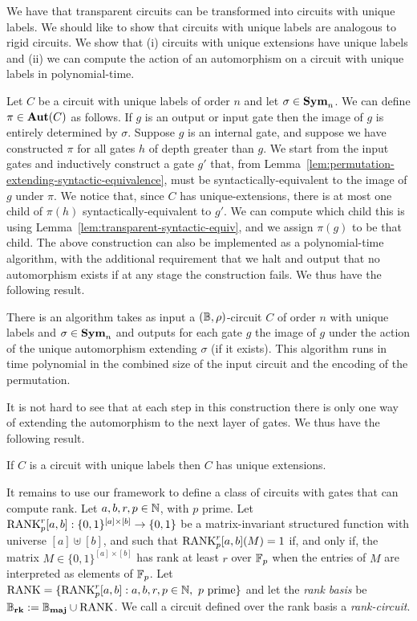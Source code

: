 \documentclass[a4paper,UKenglish]{lipics-v2018}
\begin{document}
We have that transparent circuits can be transformed into circuits with unique
labels. We should like to show that circuits with unique labels are analogous to
rigid circuits. We show that (i) circuits with unique extensions have unique
labels and (ii) we can compute the action of an automorphism on a circuit with
unique labels in polynomial-time.

Let $C$ be a circuit with unique labels of order $n$ and let $\sigma \in
\text{\textbf{Sym}}_n$. We can define $\pi \in \text{\textbf{Aut}}(C)$ as follows. If $g$ is an output or
input gate then the image of $g$ is entirely determined by $\sigma$. Suppose $g$
is an internal gate, and suppose we have constructed $\pi$ for all gates $h$ of
depth greater than $g$. We start from the input gates and inductively construct
a gate $g'$ that, from
Lemma~\ref{lem:permutation-extending-syntactic-equivalence}, must be
syntactically-equivalent to the image of $g$ under $\pi$. We notice that, since
$C$ has unique-extensions, there is at most one child of $ \pi(h)$
syntactically-equivalent to $g'$. We can compute which child this is using
Lemma~\ref{lem:transparent-syntactic-equiv}, and we assign $\pi(g)$ to be that
child. The above construction can also be implemented as a polynomial-time
algorithm, with the additional requirement that we halt and output that no
automorphism exists if at any stage the construction fails. We thus have the
following result.

\begin{lemma}
  There is an algorithm takes as input a $(\mathbb{B}, \rho)$-circuit $C$ of order $n$
  with unique labels and $\sigma \in \text{\textbf{Sym}}_n$ and outputs for each gate $g$ the
  image of $g$ under the action of the unique automorphism extending $\sigma$
  (if it exists). This algorithm runs in time polynomial in the combined size of
  the input circuit and the encoding of the permutation.
  \label{lem:compute-automorphisms}
\end{lemma}

It is not hard to see that at each step in this construction there is only one
way of extending the automorphism to the next layer of gates. We thus have the
following result.

\begin{lemma}
  If $C$ is a circuit with unique labels then $C$ has unique extensions.
  \label{lem:unique-labels-unique-extensions}
\end{lemma}

It remains to use our framework to define a class of circuits with gates that
can compute rank. Let $a, b, r, p \in \mathbb{N}$, with $p$ prime. Let
$\text{\upshape RANK}^r_p[a,b] : \{0,1\}^{[a] \times [b]} \rightarrow \{0,1\}$ be a
matrix-invariant structured function with universe $[a] \uplus [b]$, and such
that $\text{\upshape RANK}^r_p[a,b](M) = 1$ if, and only if, the matrix $M \in \{0,1\}^{[a]
  \times [b]}$ has rank at least $r$ over $\mathbb{F}_p$ when the entries of $M$ are
interpreted as elements of $\mathbb{F}_p$. Let $\text{\upshape RANK} = \{\text{\upshape RANK}^{r}_p[a,b] : a, b, r, p
\in \mathbb{N}, \text{ $p$ prime}\}$ and let the \emph{rank basis} be $\mathbb{B}_{\text{\textbf{rk}}} := \mathbb{B}_{\text{\textbf{maj}}}
\cup \text{\upshape RANK}$. We call a circuit defined over the rank basis a
\emph{rank-circuit}.
\end{document}
